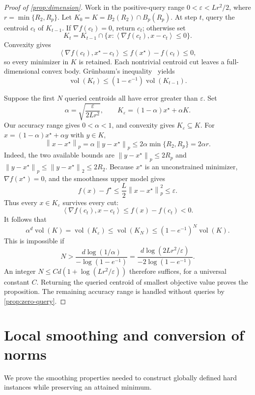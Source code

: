 \documentclass[11pt]{article}
\newcommand{\ip}[2]{\left\langle #1,#2\right\rangle}
\newcommand{\norm}[2]{\left\lVert #1\right\rVert_{#2}}
\newcommand{\vol}{\operatorname{vol}}
\newcommand{\eps}{\varepsilon}
\theoremstyle{definition}
\theoremstyle{remark}
\begin{document}
\begin{proof}[Proof of \cref{prop:dimension}]
Work in the positive-query range $0<\eps<Lr^2/2$, where
$r=\min\{R_2,R_p\}$.
Let $K_0=K=B_2(R_2)\cap B_p(R_p)$.
At step $t$, query the centroid $c_t$ of $K_{t-1}$.
If $\nabla f(c_t)=0$, return $c_t$; otherwise set
\[
 K_t=K_{t-1}\cap
 \{x:\ip{\nabla f(c_t)}{x-c_t}\le0\}.
\]
Convexity gives
\[
 \ip{\nabla f(c_t)}{x^\star-c_t}
 \le f(x^\star)-f(c_t)\le0,
\]
so every minimizer in $K$ is retained.
Each nontrivial centroid cut leaves a full-dimensional convex body.
Gr\"unbaum's inequality~\citep{Grunbaum1960} yields
\[
 \vol(K_t)\le(1-e^{-1})\vol(K_{t-1}).
\]

Suppose the first $N$ queried centroids all have error greater than
$\eps$.  Set
\[
 \alpha=\sqrt{\frac{\eps}{2Lr^2}},
 \qquad K_\eps=(1-\alpha)x^\star+\alpha K.
\]
Our accuracy range gives $0<\alpha<1$, and convexity gives
$K_\eps\subseteq K$.
For $x=(1-\alpha)x^\star+\alpha y$ with $y\in K$,
\[
 \norm{x-x^\star}{p}
 =\alpha\norm{y-x^\star}{p}
 \le2\alpha\min\{R_2,R_p\}=2\alpha r.
\]
Indeed, the two available bounds are
$\norm{y-x^\star}{p}\le2R_p$ and
$\norm{y-x^\star}{p}\le\norm{y-x^\star}{2}\le2R_2$.
Because $x^\star$ is an unconstrained minimizer,
$\nabla f(x^\star)=0$, and the smoothness upper model gives
\[
 f(x)-f^\star\le\frac L2\norm{x-x^\star}{p}^2\le\eps.
\]
Thus every $x\in K_\eps$ survives every cut:
\[
 \ip{\nabla f(c_t)}{x-c_t}
 \le f(x)-f(c_t)<0.
\]
It follows that
\[
 \alpha^d\vol(K)=\vol(K_\eps)
 \le\vol(K_N)
 \le(1-e^{-1})^N\vol(K).
\]
This is impossible if
\[
 N>\frac{d\log(1/\alpha)}{-\log(1-e^{-1})}
   =\frac{d\log(2Lr^2/\eps)}{-2\log(1-e^{-1})}.
\]
An integer $N\le C d(1+\log(Lr^2/\eps))$ therefore suffices, for a
universal constant $C$.  Returning the queried centroid of smallest
objective value proves the proposition.  The remaining accuracy range
is handled without queries by \cref{prop:zero-query}.
\end{proof}

\section{Local smoothing and conversion of norms}
\label{app:smoothing}

We prove the smoothing properties needed to construct globally defined
hard instances while preserving an attained minimum.
\end{document}
